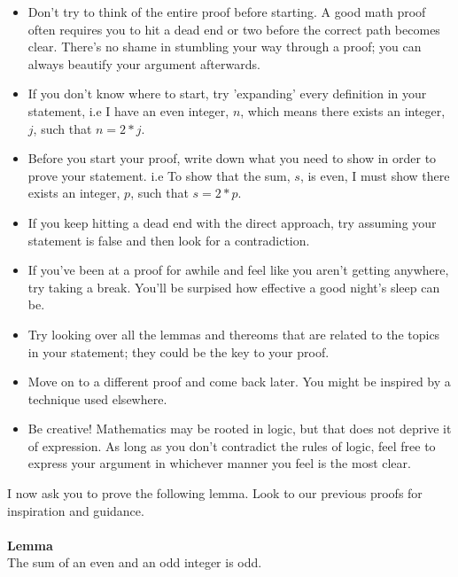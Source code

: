 \documentclass[a4paper,12pt]{article}
\begin{document}
\begin{itemize}
\item Don't try to think of the entire proof before starting. A good math proof often requires you to hit a dead end or two before the correct path becomes clear. There's no shame in stumbling your way through a proof; you can always beautify your argument afterwards.    
\item If you don't know where to start, try 'expanding' every definition in your statement, i.e I have an even integer, $n$, which means there exists an integer, $j$, such that $n = 2*j$.
\item Before you start your proof, write down what you need to show in order to prove your statement. i.e To show that the sum, $s$, is even, I must show there exists an integer, $p$, such that $s = 2*p$.
\item If you keep hitting a dead end with the direct approach, try assuming your statement is false and then look for a contradiction.
\item If you've been at a proof for awhile and feel like you aren't getting anywhere, try taking a break. You'll be surpised how effective a good night's sleep can be.
\item Try looking over all the lemmas and thereoms that are related to the topics in your statement; they could be the key to your proof.
\item Move on to a different proof and come back later. You might be inspired by a technique used elsewhere.
\item Be creative! Mathematics may be rooted in logic, but that does not deprive it of expression. As long as you don't contradict the rules of logic, feel free to express your argument in whichever manner you feel is the most clear.
\end{itemize}
I now ask you to prove the following lemma. Look to our previous proofs for inspiration and guidance.\\
\\
\textbf{Lemma}\\
The sum of an even and an odd integer is odd.\\
\end{document}
